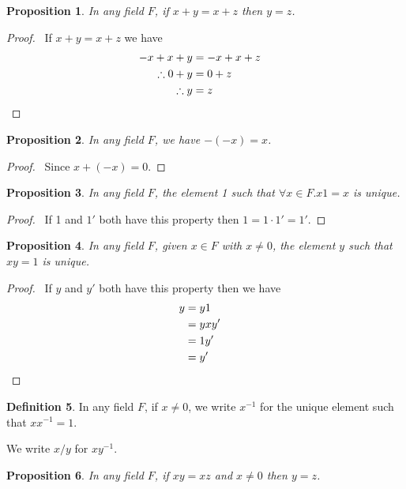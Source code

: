 \documentclass{book}
\let\qed\relax
\newtheorem{prop}{Proposition}[chapter]
\theoremstyle{definition}
\newtheorem{df}[prop]{Definition}
\begin{document}
\begin{prop}
In any field $F$, if $x + y = x + z$ then $y = z$.
\end{prop}

\begin{proof}
\pf\ If $x + y = x + z$ we have
\begin{align*}
-x + x + y & = -x + x + z \\
\therefore 0 + y & = 0 + z \\
\therefore y & = z & \qed
\end{align*}
\end{proof}

\begin{prop}
\label{prop:minus_minus}
In any field $F$, we have $-(-x) = x$.
\end{prop}

\begin{proof}
\pf\ Since $x + (-x) = 0$. \qed
\end{proof}

\begin{prop}
In any field $F$, the element 1 such that $\forall x \in F. x1 = x$ is unique.
\end{prop}

\begin{proof}
\pf\ If 1 and $1'$ both have this property then $1 = 1 \cdot 1' = 1'$. \qed
\end{proof}

\begin{prop}
In any field $F$, given $x \in F$ with $x \neq 0$, the element $y$ such that $xy = 1$ is unique.
\end{prop}

\begin{proof}
\pf\ If $y$ and $y'$ both have this property then we have
\begin{align*}
y & = y1 \\
& = y x y' \\
& = 1 y' \\
& = y' & \qed
\end{align*}
\end{proof}

\begin{df}
In any field $F$, if $x \neq 0$, we write $x^{-1}$ for the unique element such that $x x^{-1} = 1$.

We write $x/y$ for $xy^{-1}$.
\end{df}

\begin{prop}
In any field $F$, if $xy = xz$ and $x \neq 0$ then $y = z$.
\end{prop}
\end{document}
